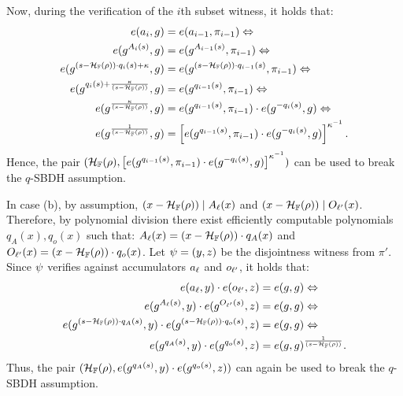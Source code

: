 Now, during the verification of the $i$th subset witness, it holds that:
\begin{align*}
    e(\textcolor{black}{a}_i,g) &= e(\textcolor{black}{a}_{i-1},\pi_{i-1}) \Leftrightarrow\\
    e(g^{A_i(s)},g) &= e(g^{A_{i-1}(s)},\pi_{i-1})\Leftrightarrow\\
    e(g^{(s-\mathcal{H}_{\mathbb{F}}(\rho))\cdot q_{i}(s) + \kappa},g) &= e(g^{(s-\mathcal{H}_{\mathbb{F}}(\rho))\cdot q_{i-1}(s)},\pi_{i-1})\Leftrightarrow\\
        e(g^{q_{i}(s) + \frac{\kappa}{(s-\mathcal{H}_{\mathbb{F}}(\rho))}},g) &= e(g^{q_{i-1}(s)},\pi_{i-1})\Leftrightarrow\\
        e(g^{\frac{\kappa}{(s-\mathcal{H}_{\mathbb{F}}(\rho))}},g) &= e(g^{q_{i-1}(s)},\pi_{i-1})\cdot e(g^{-q_{i}(s)},g)\Leftrightarrow\\
        e(g^{\frac{1}{(s-\mathcal{H}_{\mathbb{F}}(\rho))}},g) &= \left[ e(g^{q_{i-1}(s)},\pi_{i-1})\cdot e(g^{-q_{i}(s)},g)\right]^{\kappa^{-1}}.
\end{align*}
Hence, the pair $(\mathcal{H}_{\mathbb{F}}(\rho), \left[ e(g^{q_{i-1}(s)},\pi_{i-1})\cdot e(g^{-q_{i}(s)},g)\right]^{\kappa^{-1}})$ can be used to break the $q$-SBDH assumption.

In case (b), by assumption, $(x-\mathcal{H}_{\mathbb{F}}(\rho)) \mathrel| A_\ell(x)$ and $ (x-\mathcal{H}_{\mathbb{F}}(\rho)) \mathrel| O_{\ell'}(x)$. 
Therefore, by polynomial division there exist efficiently computable polynomials $q_A{(x)},q_o(x)$ such that: 
$A_{\ell}(x) = (x-\mathcal{H}_{\mathbb{F}}(\rho))\cdot q_A(x)$ and $O_{\ell'}(x) = (x-\mathcal{H}_{\mathbb{F}}(\rho))\cdot q_o(x)$.
Let $\textcolor{black}{\psi} = (y,z)$ be the disjointness witness from $\pi'$.
Since $\textcolor{black}{\psi}$ verifies against accumulators $\textcolor{black}{a}_\ell$ and $o_{\ell'}$, it holds that:
\begin{align*}
    e(\textcolor{black}{a}_\ell,y) \cdot e(o_{\ell'},z) &= e(g,g) \Leftrightarrow\\
    e(g^{A_\ell(s)},y) \cdot e(g^{O_{\ell'}(s)},z) &= e(g,g) \Leftrightarrow\\
    e(g^{(s-\mathcal{H}_{\mathbb{F}}(\rho))\cdot q_A(s)},y) \cdot     e(g^{(s-\mathcal{H}_{\mathbb{F}}(\rho))\cdot q_o(s)},z) &= e(g,g)\Leftrightarrow\\
    e(g^{q_A(s)},y) \cdot e(g^{q_o(s)},z) &= e(g,g)^{\frac{1}{(s-\mathcal{H}_{\mathbb{F}}(\rho))}}.
\end{align*}
Thus, the pair $(\mathcal{H}_{\mathbb{F}}(\rho), e(g^{q_A(s)},y) \cdot e(g^{q_o(s)},z))$ can again be used to break the $q$-SBDH assumption.

